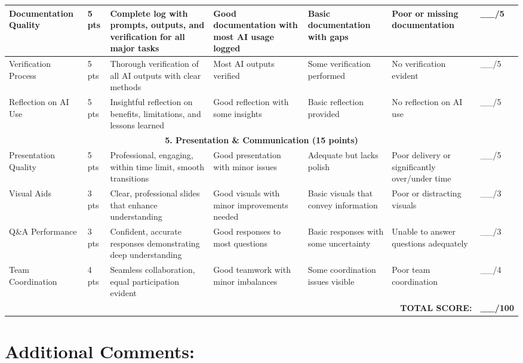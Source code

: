 \documentclass[11pt,landscape]{article}
\begin{document}
\begin{longtable}{|p{3.5cm}|p{1.5cm}|p{4cm}|p{4cm}|p{4cm}|p{4cm}|p{1.5cm}|}
Documentation Quality & 5 pts &
Complete log with prompts, outputs, and verification for all major tasks &
Good documentation with most AI usage logged &
Basic documentation with gaps &
Poor or missing documentation &
\_\_/5 \\
\hline

Verification Process & 5 pts &
Thorough verification of all AI outputs with clear methods &
Most AI outputs verified &
Some verification performed &
No verification evident &
\_\_/5 \\
\hline

Reflection on AI Use & 5 pts &
Insightful reflection on benefits, limitations, and lessons learned &
Good reflection with some insights &
Basic reflection provided &
No reflection on AI use &
\_\_/5 \\
\hline

\multicolumn{7}{|c|}{\textbf{5. Presentation \& Communication (15 points)}} \\
\hline

Presentation Quality & 5 pts &
Professional, engaging, within time limit, smooth transitions &
Good presentation with minor issues &
Adequate but lacks polish &
Poor delivery or significantly over/under time &
\_\_/5 \\
\hline

Visual Aids & 3 pts &
Clear, professional slides that enhance understanding &
Good visuals with minor improvements needed &
Basic visuals that convey information &
Poor or distracting visuals &
\_\_/3 \\
\hline

Q\&A Performance & 3 pts &
Confident, accurate responses demonstrating deep understanding &
Good responses to most questions &
Basic responses with some uncertainty &
Unable to answer questions adequately &
\_\_/3 \\
\hline

Team Coordination & 4 pts &
Seamless collaboration, equal participation evident &
Good teamwork with minor imbalances &
Some coordination issues visible &
Poor team coordination &
\_\_/4 \\
\hline

\multicolumn{6}{|r|}{\textbf{TOTAL SCORE:}} & \textbf{\_\_/100} \\
\hline

\end{longtable}

\section*{Additional Comments:}
\vspace{3cm}
\end{document}
